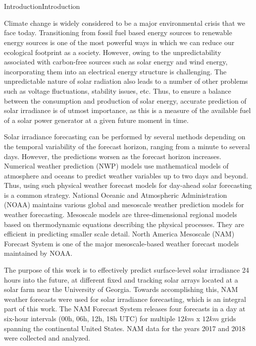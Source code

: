 \chapter{}{Introduction}{Introduction}
\par Climate change is widely considered to be a major environmental crisis that we face today. Transitioning from fossil fuel based energy sources to renewable energy sources is one of the most powerful ways in which we can reduce our ecological footprint as a society. However, owing to the unpredictability associated with carbon-free sources such as solar energy and wind energy, incorporating them into an electrical energy structure is challenging. The unpredictable nature of solar radiation also leads to a number of other problems such as voltage fluctuations, stability issues, etc. Thus, to ensure a balance between the consumption and production of solar energy, accurate prediction of solar irradiance is of utmost importance, as this is a measure of the available fuel of a solar power generator at a given future moment in time. \cite{exec_summary_1}

\par Solar irradiance forecasting can be performed by several methods depending on the temporal variability of the forecast horizon, ranging from a minute to several days. However, the predictions worsen as the forecast horizon increases. Numerical weather prediction (NWP) models use mathematical models of atmosphere and oceans to predict weather variables up to two days and beyond. Thus, using such physical weather forecast models for day-ahead solar forecasting is a common strategy. National Oceanic and Atmospheric Administration (NOAA) maintains various global and mesoscale weather prediction models for weather forecasting. Mesoscale models are three-dimensional regional models based on thermodynamic equations describing the physical processes. They are efficient in predicting smaller scale detail. North America Mesoscale (NAM) Forecast System \cite{litrev_nwp_nam} is one of the major mesoscale-based weather forecast models maintained by NOAA.

\par The purpose of this work is to effectively predict surface-level solar irradiance 24 hours into the future, at different fixed and tracking solar arrays located at a solar farm near the University of Georgia. Towards accomplishing this, NAM weather forecasts were used for solar irradiance forecasting, which is an integral part of this work. The NAM Forecast System releases four forecasts in a day at six-hour intervals (00h, 06h, 12h, 18h UTC) for multiple $12km$ x $12km$ grids spanning \restoregeometry\noindent the continental United States. NAM data for the years 2017 and 2018 were collected and analyzed.

